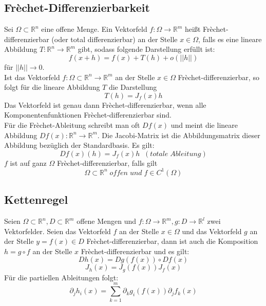 \documentclass[a4paper,twocolumn,10pt]{article}
\begin{document}
\subsection{Frèchet-Differenzierbarkeit}
Sei $\Omega\subset\mathbb{R}^n$ eine offene Menge. Ein Vektorfeld $f:\Omega\rightarrow \mathbb{R}^m$ heißt Frèchet-differenzierbar (oder total differenzierbar) an der Stelle $x\in\Omega$, falls es eine lineare Abbildung $T:\mathbb{R}^n\rightarrow\mathbb{R}^m$ gibt, sodass folgende Darstellung erfüllt ist:
\begin{equation*}
f(x+h)=f(x)+T(h)+o(||h||)
\end{equation*}
für $||h||\rightarrow 0$.\\
Ist das Vektorfeld $f:\Omega\subset\mathbb{R}^n\rightarrow\mathbb{R}^m$ an der Stelle $x\in\Omega$ Frèchet-differenzierbar, so folgt für die lineare Abbildung $T$ die Darstellung
\begin{equation*}
T(h)=J_f(x)h
\end{equation*}
Das Vektorfeld ist genau dann Frèchet-differenzierbar, wenn alle Komponentenfunktionen Frèchet-differenzierbar sind.\\
Für die Frèchet-Ableitung schreibt man oft $Df(x)$ und meint die lineare Abbildung $Df(x):\mathbb{R}^n\rightarrow\mathbb{R}^m$. Die Jacobi-Matrix ist die Abbildungsmatrix dieser Abbildung bezüglich der Standardbasis. Es gilt:
\begin{equation*}
Df(x)(h)=J_f(x)h\;\;(totale\;Ableitung)
\end{equation*}
$f$ ist auf ganz $\Omega$ Frèchet-differenzierbar, falls gilt
\begin{equation*}
\Omega\subset\mathbb{R}^n\;offen\;und\;f\in C^1(\Omega)
\end{equation*}

\subsection{Kettenregel}
Seien $\Omega\subset\mathbb{R}^n,D\subset\mathbb{R}^m$ offene Mengen und $f:\Omega\rightarrow\mathbb{R}^m, g:D\rightarrow\mathbb{R}^l$ zwei Vektorfelder. Seien das Vektorfeld $f$ an der Stelle $x\in\Omega$ und das Vektorfeld $g$ an der Stelle $y=f(x)\in D$ Frèchet-differenzierbar, dann ist auch die Komposition $h=g\circ f$ an der Stelle $x$ Frèchet-differenzierbar und es gilt:
\begin{equation*}
Dh(x)=Dg(f(x))\circ Df(x)
\end{equation*}
\begin{equation*}
J_h(x)=J_g(f(x))J_f(x)
\end{equation*}
Für die partiellen Ableitungen folgt:
\begin{equation*}
\partial_j h_i(x)=\sum\limits_{k=1}^{m}\partial_k g_i(f(x))\partial_j f_k(x)
\end{equation*}
\end{document}
